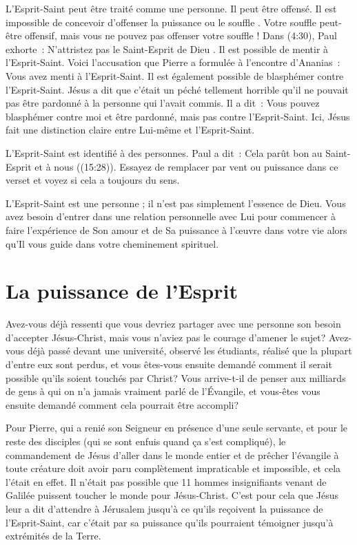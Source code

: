 L'Esprit-Saint peut être traité comme une personne. Il peut être offensé.
 Il est impossible de concevoir d'offenser \og la puissance \fg{} ou
 \og le souffle \fg{}. Votre souffle peut-être offensif, mais vous ne pouvez
 pas offenser votre souffle ! Dans (4:30), Paul exhorte~:
 \og N'attristez pas le Saint-Esprit de Dieu \fg{}.
 Il est possible de mentir à l'Esprit-Saint. Voici l'accusation que Pierre a
 formulée à l'encontre d'Ananias~:
 \og Vous avez menti à l'Esprit-Saint. \fg{}
 Il est également possible de blasphémer contre l'Esprit-Saint.
 Jésus a dit que c'était un péché tellement horrible qu'il ne pouvait pas
 être pardonné à la personne qui l'avait commis. Il a dit~:
 \og Vous pouvez blasphémer contre moi et être pardonné, mais pas contre
 l'Esprit-Saint. \fg{}
 Ici, Jésus fait une distinction claire entre Lui-même et l'Esprit-Saint.

L'Esprit-Saint est identifié à des personnes. Paul a dit~:
 \og Cela parût bon au Saint-Esprit et à nous \fg{}
 ((15:28)).
 Essayez de remplacer par vent ou puissance dans ce verset et voyez si cela
 a toujours du sens.

L'Esprit-Saint est une personne ; il n'est pas simplement l'essence de Dieu.
 Vous avez besoin d'entrer dans une relation personnelle avec Lui pour
 commencer à faire l'expérience de Son amour et de Sa puissance à l'œuvre
 dans votre vie alors qu'Il vous guide dans votre cheminement spirituel.


\section*{La puissance de l'Esprit}

Avez-vous déjà ressenti que vous devriez partager avec une personne son
 besoin d'accepter Jésus-Christ, mais vous n'aviez pas le courage d'amener
 le sujet?
 Avez-vous déjà passé devant une université, observé les étudiants,
 réalisé que la plupart d'entre eux sont perdus, et vous êtes-vous ensuite
 demandé comment il serait possible qu'ils soient touchés par Christ?
 Vous arrive-t-il de penser aux milliards de gens à qui on n'a jamais vraiment
 parlé de l'Évangile, et vous-êtes vous ensuite demandé comment cela pourrait
 être accompli?

Pour Pierre, qui a renié son Seigneur en présence d'une seule servante,
 et pour le reste des disciples (qui se sont enfuis quand ça s'est compliqué),
 le commandement de Jésus d'aller dans le monde entier et de prêcher
 l'évangile à toute créature doit avoir paru complètement impraticable et
 impossible, et cela l'était en effet.
 Il n'était pas possible que 11 hommes insignifiants venant de Galilée
 puissent toucher le monde pour Jésus-Christ.
 C'est pour cela que Jésus leur a dit d'attendre à Jérusalem jusqu'à ce
 qu'ils reçoivent la puissance de l'Esprit-Saint, car c'était par sa puissance
 qu'ils pourraient témoigner jusqu'à extrémités de la Terre.

